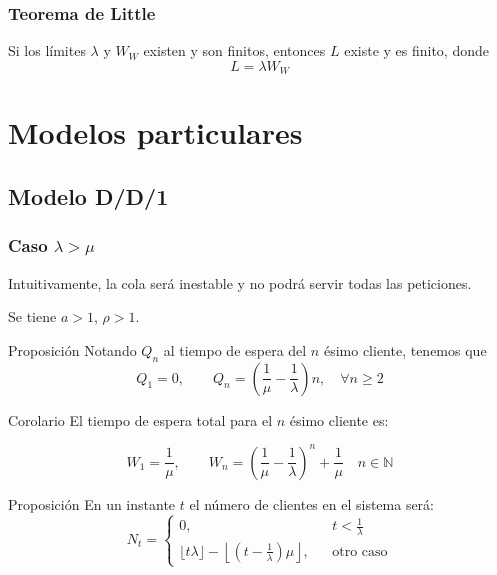 \documentclass[8pt]{beamer}
\begin{document}
  \begin{frame}\frametitle{Teorema de Little}
    Si los límites $\lambda$ y $W_W$ existen y son finitos, entonces $L$ existe y es finito, donde 
    \[L = \lambda W_W\]
  \end{frame}
\section{Modelos particulares}

  \subsection{Modelo D/D/1}
  \begin{frame}\frametitle{Caso $\lambda > \mu$}
    Intuitivamente, la cola será inestable y no podrá servir todas las peticiones. 

    Se tiene $a > 1$, $\rho > 1$.

    \begin{block}{Proposición}
      Notando $Q_n$ al tiempo de espera del $n$ ésimo cliente, tenemos que \[Q_1 = 0, \qquad Q_n = \left(\frac{1}{\mu} - \frac{1}{\lambda}\right)n, \quad \forall n\ge 2\]
    \end{block}

    \begin{block}{Corolario}
      El tiempo de espera total para el $n$ ésimo cliente es:
 
      \[W_1 = \frac{1}{\mu}, \qquad W_n = \left(\frac{1}{\mu} - \frac{1}{\lambda}\right)^n + \frac{1}{\mu} \quad n\in \mathbb{N}\]
    \end{block}

    \begin{block}{Proposición}
      En un instante $t$ el número de clientes en el sistema será: 
      \[N_t = \left\{\begin{array}{lcc}
      0, && t < \frac{1}{\lambda}\\
      \lfloor t\lambda \rfloor - \left\lfloor\left(t-\frac{1}{\lambda}\right)\mu\right\rfloor, && \text{otro caso}
      \end{array}\right.\]
    \end{block}

  \end{frame}
\end{document}
